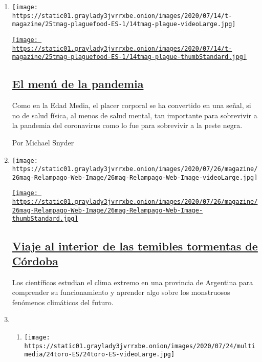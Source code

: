\begin{enumerate}
\def\labelenumi{\arabic{enumi}.}
\item
  \texttt{[image: https://static01.graylady3jvrrxbe.onion/images/2020/07/14/t-magazine/25tmag-plaguefood-ES-1/14tmag-plague-videoLarge.jpg]}

  \href{/es/2020/07/23/t-magazine/comida-pandemia.html}{\texttt{[image: https://static01.graylady3jvrrxbe.onion/images/2020/07/14/t-magazine/25tmag-plaguefood-ES-1/14tmag-plague-thumbStandard.jpg]}}

  \hypertarget{el-menuxfa-de-la-pandemia}{%
  \subsection{\texorpdfstring{\href{/es/2020/07/23/t-magazine/comida-pandemia.html}{El
  menú de la
  pandemia}}{El menú de la pandemia}}\label{el-menuxfa-de-la-pandemia}}

  Como en la Edad Media, el placer corporal se ha convertido en una
  señal, si no de salud física, al menos de salud mental, tan importante
  para sobrevivir a la pandemia del coronavirus como lo fue para
  sobrevivir a la peste negra.

  Por Michael Snyder
\item
  \texttt{[image: https://static01.graylady3jvrrxbe.onion/images/2020/07/26/magazine/26mag-Relampago-Web-Image/26mag-Relampago-Web-Image-videoLarge.jpg]}

  \href{/es/interactive/2020/07/23/espanol/ciencia-y-tecnologia/cordoba-tormentas-argentina.html}{\texttt{[image: https://static01.graylady3jvrrxbe.onion/images/2020/07/26/magazine/26mag-Relampago-Web-Image/26mag-Relampago-Web-Image-thumbStandard.jpg]}}

  \hypertarget{viaje-al-interior-de-las-temibles-tormentas-de-cuxf3rdoba}{%
  \subsection{\texorpdfstring{\href{/es/interactive/2020/07/23/espanol/ciencia-y-tecnologia/cordoba-tormentas-argentina.html}{Viaje
  al interior de las temibles tormentas de
  Córdoba}}{Viaje al interior de las temibles tormentas de Córdoba}}\label{viaje-al-interior-de-las-temibles-tormentas-de-cuxf3rdoba}}

  Los científicos estudian el clima extremo en una provincia de
  Argentina para comprender su funcionamiento y aprender algo sobre los
  monstruosos fenómenos climáticos del futuro.
\item
  \begin{enumerate}
  \def\labelenumii{\arabic{enumii}.}
  \item
    \texttt{[image: https://static01.graylady3jvrrxbe.onion/images/2020/07/24/multimedia/24toro-ES/24toro-ES-videoLarge.jpg]}


\end{enumerate}
\end{enumerate}
